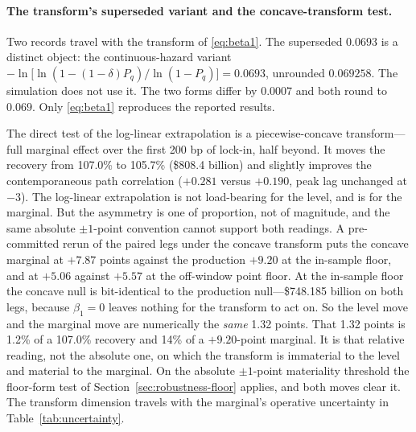 \documentclass[12pt]{article}
\begin{document}
\paragraph{The transform's superseded variant and the concave-transform test.}
Two records travel with the transform of \eqref{eq:beta1}. The superseded $0.0693$ is a distinct object: the continuous-hazard variant $-\ln\!\big[\ln(1-(1-\delta)P_q)/\ln(1-P_q)\big] = 0.0693$, unrounded $0.069258$. The simulation does not use it. The two forms differ by $0.0007$ and both round to $0.069$. Only \eqref{eq:beta1} reproduces the reported results.

The direct test of the log-linear extrapolation is a piecewise-concave transform---full marginal effect over the first 200 bp of lock-in, half beyond. It moves the recovery from 107.0\% to 105.7\% (\$808.4 billion) and slightly improves the contemporaneous path correlation ($+0.281$ versus $+0.190$, peak lag unchanged at $-3$). The log-linear extrapolation is not load-bearing for the level, and is for the marginal. But the asymmetry is one of proportion, not of magnitude, and the same absolute $\pm 1$-point convention cannot support both readings. A pre-committed rerun of the paired legs under the concave transform puts the concave marginal at $+7.87$ points against the production $+9.20$ at the in-sample floor, and at $+5.06$ against $+5.57$ at the off-window point floor. At the in-sample floor the concave null is bit-identical to the production null---\$748.185 billion on both legs, because $\beta_1 = 0$ leaves nothing for the transform to act on. So the level move and the marginal move are numerically the \emph{same} 1.32 points. That 1.32 points is 1.2\% of a 107.0\% recovery and 14\% of a $+9.20$-point marginal. It is that relative reading, not the absolute one, on which the transform is immaterial to the level and material to the marginal. On the absolute $\pm 1$-point materiality threshold the floor-form test of Section~\ref{sec:robustness-floor} applies, and both moves clear it. The transform dimension travels with the marginal's operative uncertainty in Table~\ref{tab:uncertainty}.
\end{document}
